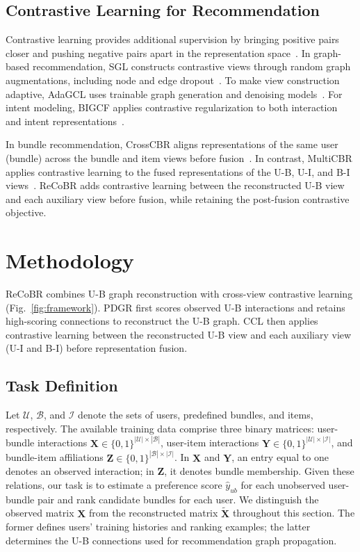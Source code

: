\documentclass[letterpaper,journal]{IEEEtran}
\begin{document}
\subsection{Contrastive Learning for Recommendation}

Contrastive learning provides additional supervision by bringing positive pairs closer and pushing negative pairs apart in the representation space~\cite{chen2020simclr}. In graph-based recommendation, SGL constructs contrastive views through random graph augmentations, including node and edge dropout~\cite{wu2021sgl}. To make view construction adaptive, AdaGCL uses trainable graph generation and denoising models~\cite{jiang2023adagcl}. For intent modeling, BIGCF applies contrastive regularization to both interaction and intent representations~\cite{zhang2024bigcf}.

In bundle recommendation, CrossCBR aligns representations of the same user (bundle) across the bundle and item views before fusion~\cite{ma2022crosscbr}. In contrast, MultiCBR applies contrastive learning to the fused representations of the U-B, U-I, and B-I views~\cite{ma2024multicbr}. ReCoBR adds contrastive learning between the reconstructed U-B view and each auxiliary view before fusion, while retaining the post-fusion contrastive objective.

\section{Methodology}\label{sec:methodology}

ReCoBR combines U-B graph reconstruction with cross-view contrastive learning (Fig.~\ref{fig:framework}). PDGR first scores observed U-B interactions and retains high-scoring connections to reconstruct the U-B graph. CCL then applies contrastive learning between the reconstructed U-B view and each auxiliary view (U-I and B-I) before representation fusion.

\subsection{Task Definition}

Let $\mathcal U$, $\mathcal B$, and $\mathcal I$ denote the sets of users, predefined bundles, and items, respectively. The available training data comprise three binary matrices: user-bundle interactions $\mathbf X\in\{0,1\}^{|\mathcal U|\times|\mathcal B|}$, user-item interactions $\mathbf Y\in\{0,1\}^{|\mathcal U|\times|\mathcal I|}$, and bundle-item affiliations $\mathbf Z\in\{0,1\}^{|\mathcal B|\times|\mathcal I|}$. In $\mathbf X$ and $\mathbf Y$, an entry equal to one denotes an observed interaction; in $\mathbf Z$, it denotes bundle membership. Given these relations, our task is to estimate a preference score $\hat y_{ub}$ for each unobserved user-bundle pair and rank candidate bundles for each user. We distinguish the observed matrix $\mathbf X$ from the reconstructed matrix $\widetilde{\mathbf X}$ throughout this section. The former defines users' training histories and ranking examples; the latter determines the U-B connections used for recommendation graph propagation.
\end{document}
